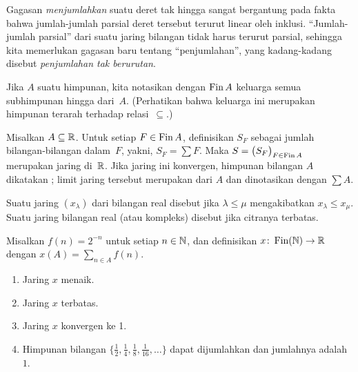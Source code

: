 Gagasan \emph{menjumlahkan} suatu deret tak hingga sangat bergantung pada fakta bahwa
jumlah-jumlah parsial deret tersebut terurut linear oleh inklusi. ``Jumlah-jumlah parsial'' dari suatu
jaring bilangan tidak harus terurut parsial, sehingga kita memerlukan gagasan baru tentang
``penjumlahan'', yang kadang-kadang disebut \emph{penjumlahan tak berurutan}.

\begin{notn} Jika $A$ suatu himpunan, kita notasikan
dengan $\operatorname{Fin} A$ keluarga semua subhimpunan hingga dari~$A$. (Perhatikan bahwa keluarga ini merupakan himpunan terarah terhadap
relasi~$\subseteq$.)
\end{notn}

\begin{defn}\label{def_summable_R} Misalkan $A \subseteq \mathbb{R}$. Untuk setiap $F \in \operatorname{Fin} A$, definisikan $S_F$ sebagai jumlah
bilangan-bilangan dalam~$F$, yakni, $S_F = \sum F$. Maka $S = \bigl(S_F\bigr)_{F \in \operatorname{Fin} A}$
merupakan jaring di~$\mathbb{R}$. Jika jaring ini konvergen, himpunan bilangan $A$ dikatakan
; limit jaring tersebut merupakan
 dari $A$ dan dinotasikan dengan $\sum A$.
\end{defn}

\begin{defn} Suatu jaring $(x_\lambda)$ dari bilangan real disebut
 jika $\lambda \le \mu$ mengakibatkan $x_\lambda \le x_\mu$. Suatu jaring bilangan real (atau kompleks)
disebut
 jika citranya terbatas.
\end{defn}

\begin{exam}\label{C031454} Misalkan $f(n) = 2^{-n}$ untuk setiap $n \in \mathbb{N}$, dan definisikan $x \colon
\operatorname{Fin}(\mathbb{N}) \rightarrow \mathbb{R}$ dengan $x(A) = \sum_{n \in A}f(n)$.
 \begin{enumerate}
  \item Jaring $x$ menaik.
  \item Jaring $x$ terbatas.
  \item Jaring $x$ konvergen ke 1.
  \item Himpunan bilangan $\{\frac12,\frac14,\frac18, \frac1{16},\dots\}$ dapat dijumlahkan dan
jumlahnya adalah~$1$.
  \end{enumerate}
\end{exam}

